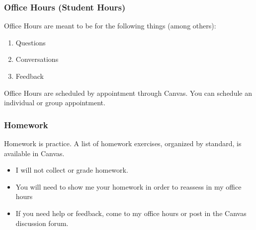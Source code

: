 \documentclass[aspectration=1610]{beamer}
\begin{document}
\begin{frame}\frametitle{Office Hours (Student Hours)}
Office Hours are meant to be for the following things (among others):
\begin{enumerate}
\item Questions
\item Conversations
\item Feedback
\end{enumerate}

\vspace{0.2in}

Office Hours are scheduled by appointment through Canvas. You can schedule an individual or group appointment.
\end{frame}



\begin{frame}\frametitle{Homework}
Homework is practice.  A list of homework exercises, organized by standard, is available in Canvas.
\begin{itemize}
\item I will not collect or grade homework.
\item You will need to show me your homework in order to reassess in my office hours
\item If you need help or feedback, come to my office hours or post in the Canvas discussion forum.
\end{itemize}
\end{frame}


\end{document}
